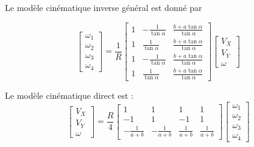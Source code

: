 \noindent Le modèle cinématique inverse général est donné par

\[
\begin{bmatrix}
\omega_1 \\
\omega_2 \\
\omega_3 \\
\omega_4
\end{bmatrix}
= \frac{1}{R}
\begin{bmatrix}
1 & -\frac{1}{\tan\alpha} & \frac{b+a\tan\alpha}{\tan\alpha} \\
1 & \frac{1}{\tan\alpha} & \frac{b+a\tan\alpha}{\tan\alpha} \\
1 & -\frac{1}{\tan\alpha} & \frac{b+a\tan\alpha}{\tan\alpha} \\
1 & \frac{1}{\tan\alpha} & \frac{b+a\tan\alpha}{\tan\alpha}
\end{bmatrix}
\begin{bmatrix}
V_X \\
V_Y \\
\omega
\end{bmatrix}
\]

\noindent Le modèle cinématique direct  est :
\[
\begin{bmatrix}
V_X \\
V_Y \\
\omega
\end{bmatrix}
= \frac{R}{4}
\begin{bmatrix}
1 & 1 & 1 & 1 \\
-1 & 1 & -1 & 1 \\
-\frac{1}{a+b} & -\frac{1}{a+b} & \frac{1}{a+b} & \frac{1}{a+b}
\end{bmatrix}
\begin{bmatrix}
\omega_1 \\
\omega_2 \\
\omega_3 \\
\omega_4
\end{bmatrix}
\]